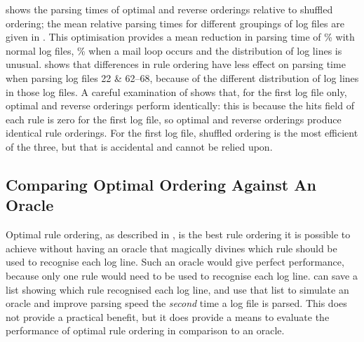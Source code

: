  shows the
parsing times of optimal and reverse orderings relative to shuffled
ordering; the mean relative parsing times for different groupings of log
files are given in .  This optimisation provides a mean reduction in parsing time of
\%
with normal log files,
\%
when a mail loop occurs and the distribution of log lines is unusual.
 shows that
differences in rule ordering have less effect on parsing time when parsing
log files 22 \& 62--68, because of the different distribution of log lines
in those log files.  A careful examination of  shows that, for the first log file
only, optimal and reverse orderings perform identically: this is because
the hits field of each rule is zero for the first log file, so optimal and
reverse orderings produce identical rule orderings.  For the first log
file, shuffled ordering is the most efficient of the three, but that is
accidental and cannot be relied upon.




\FloatBarrier{}

\subsection{Comparing Optimal Ordering Against An Oracle}

\label{perfect rule ordering}

Optimal rule ordering, as described in , is the best rule ordering it is possible to achieve without
having an oracle that magically divines which rule should be used to
recognise each log line.  Such an oracle would give perfect performance,
because only one rule would need to be used to recognise each log line.
\parsername{} can save a list showing which rule recognised each log line,
and use that list to simulate an oracle and improve parsing speed the
\textit{second\/} time a log file is parsed.  This does not provide a
practical benefit, but it does provide a means to evaluate the performance
of optimal rule ordering in comparison to an oracle.

